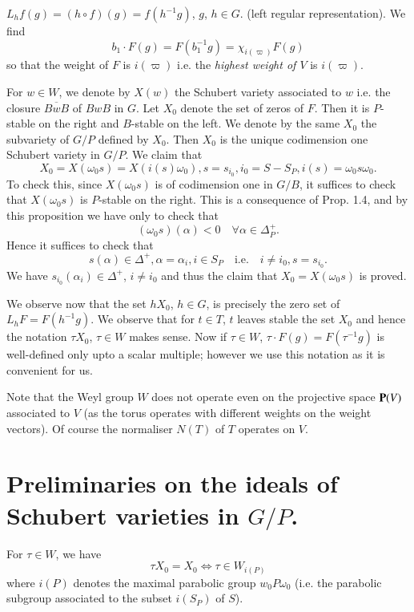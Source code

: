 $L_h f(g) = (h\circ f)(g) = f(h^{-1}g)$, $g$, $h \in G$. (left regular representation). We find 
$$
b_1 \cdot F(g) = F(b^{-1}_1 g) = \chi_{i(\varpi)} F(g)
$$
so that the weight of $F$ is $i(\varpi)$ i.e. the {\em highest weight of $V$} is $i(\varpi)$.

For $w \in W$, we denote by $X (w)$ the Schubert variety associated to $w$ i.e. the closure $\overline{B w B}$ of $BwB$ in $G$. Let $X_0$ denote the set of zeros of $F$. Then it is $P$-stable on the right and $B$-stable on the left. We denote by the same $X_0$ the subvariety of $G/P$ defined by $X_0$. Then $X_0$ is the unique codimension one Schubert variety in $G/P$. We claim that 
$$
X_0 = X (\omega_0 s) = X (i(s) \omega_0), s = s_{i_0}, i_0 = S - S_P, i(s) = \omega_0 s \omega_0.
$$\pageoriginale
To check this, since $X (\omega_0s)$ is of codimension one in $G/B$, it suffices to check that $X(\omega_0 s)$ is $P$-stable on the right. This is a consequence of Prop. 1.4, \cite{art18-key12} and by this proposition we have only to check that 
$$
(\omega_0 s) (\alpha) < 0 \quad \forall \alpha \in \Delta^+_P.
$$
Hence it suffices to check that 
$$
s(\alpha) \in \Delta^+, \alpha = \alpha_i, i\in S_P \text{ ~ i.e. ~ } i  \neq i_0, s = s_{i_0}.
$$
We have $s_{i_0} (\alpha_i) \in \Delta^+$, $i \neq i_0$ and thus the claim that $X_0 = X(\omega_0s)$ is proved.

We observe now that the set $hX_0$, $h \in G$, is precisely the zero set of $L_h F = F(h^{-1} g)$. We observe that for $t \in T$, $t$ leaves stable the set $X_0$ and hence the notation $\tau X_0$, $\tau \in W$ makes sense. Now if $\tau \in W$, $\tau \cdot F(g) = F(\tau^{-1} g)$ is well-defined only upto a scalar multiple; however we use this notation as it is convenient for us.

Note that the Weyl group $W$ does not operate even on the projective space $\mathbf{P}(V)$ associated to $V$ (as the torus operates with different weights on the weight vectors). Of course the normaliser $N(T)$ of $T$ operates on $V$.

\section{Preliminaries on the ideals of Schubert varieties in \texorpdfstring{$G/P$}{GP}.}\label{art18-sec2}
\begin{lem}\label{art18-lem1}
For $\tau \in W$, we have
$$
\tau X_0 = X_0 \Leftrightarrow \tau \in W_{i(P)}
$$
where $i(P)$ denotes the maximal parabolic group $w_0P\omega_0$ (i.e. the parabolic subgroup associated to the subset $i(S_P)$ of $S$).
\end{lem}

